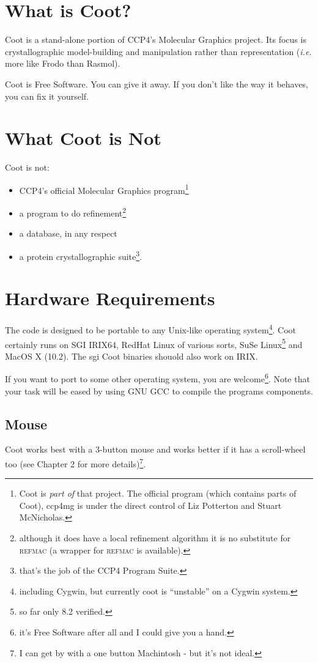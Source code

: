 \documentclass{book}
\begin{document}
\section{What is Coot?}

Coot is a stand-alone portion of CCP4's Molecular Graphics project. Its
focus is crystallographic model-building and manipulation rather than
representation (\emph{i.e.} more like Frodo than
Rasmol).

Coot is Free Software.  You can give it away. If you don't like the
way it behaves, you can fix it yourself.

\section{What Coot is Not}
Coot is not:
\begin{itemize}
\item CCP4's official Molecular Graphics program\footnote{Coot is
    \emph{part of} that project. The official program (which contains
parts of Coot), ccp4mg is under
    the direct control of Liz Potterton and Stuart McNicholas.}
\item a program to do refinement\footnote{although it does have a
    local refinement algorithm it is no substitute for \textsc{refmac}
    (a wrapper for \textsc{refmac} is available).}
\item a database, in any respect
\item a protein crystallographic suite\footnote{that's the job of the
    CCP4 Program Suite.}.
\end{itemize}

\section{Hardware Requirements}
The code is designed to be portable to any Unix-like operating
system\footnote{including Cygwin, but currently coot is ``unstable''
  on a Cygwin system.}.  Coot certainly runs on SGI IRIX64, RedHat
Linux of various sorts, SuSe Linux\footnote{so far only 8.2 verified.}
and MacOS X (10.2).  The sgi Coot binaries shouold also 
work on IRIX.

If you want to port to some other operating system, you are
welcome\footnote{it's Free Software after all and I could give you a
  hand.}.  Note that your task will be eased by using GNU GCC to compile
the programs components.

\subsection{Mouse}
Coot works best with a 3-button mouse and works better if
it has a scroll-wheel too (see Chapter 2 for more details)\footnote{I
  can get by with a one button Machintosh - but it's not ideal.}.
\end{document}
